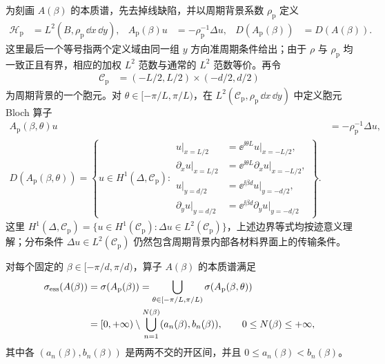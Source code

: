 为刻画 $A(\beta)$ 的本质谱，先去掉线缺陷，并以周期背景系数
$\rho_{\mathrm p}$ 定义
\begin{align}
  \mathcal H_{\mathrm p}
  &=L^2(B,\rho_{\mathrm p}\,\dd x\,\dd y),
  &
  A_{\mathrm p}(\beta)u
  &=-\rho_{\mathrm p}^{-1}\Delta u,
  &
  D(A_{\mathrm p}(\beta))&=D(A(\beta)).
  \label{eq:periodic-background-operator}
\end{align}
这里最后一个等号指两个定义域由同一组 $y$ 方向准周期条件给出；由于
$\rho$ 与 $\rho_{\mathrm p}$ 均一致正且有界，相应的加权 $L^2$ 范数与通常的
$L^2$ 范数等价。再令
\begin{align}
  \mathcal C_{\mathrm p}&=(-L/2,L/2)\times(-d/2,d/2)
  \label{eq:periodic-cell}
\end{align}
为周期背景的一个胞元。对
$\theta\in[-\pi/L,\pi/L)$，在
$L^2(\mathcal C_{\mathrm p},\rho_{\mathrm p}\,\dd x\,\dd y)$ 中定义胞元 Bloch 算子
\begin{equation}
  \begin{aligned}
    A_{\mathrm p}(\beta,\theta)u
    &=-\rho_{\mathrm p}^{-1}\Delta u,\\
    D(A_{\mathrm p}(\beta,\theta))
    =\left\{u\in H^1(\Delta,\mathcal C_{\mathrm p}):{}
    \begin{aligned}
      u|_{x=L/2}
      &=\ee^{\ii\theta L}u|_{x=-L/2},\\
      \partial_xu|_{x=L/2}
      &=\ee^{\ii\theta L}\partial_xu|_{x=-L/2},\\
      u|_{y=d/2}
      &=\ee^{\ii\beta d}u|_{y=-d/2},\\
      \partial_yu|_{y=d/2}
      &=\ee^{\ii\beta d}\partial_yu|_{y=-d/2}
    \end{aligned}\right\}.
  \end{aligned}
  \label{eq:background-bloch-fiber}
\end{equation}
这里
$H^1(\Delta,\mathcal C_{\mathrm p})
=\{u\in H^1(\mathcal C_{\mathrm p}):
\Delta u\in L^2(\mathcal C_{\mathrm p})\}$，上述边界等式均按迹意义理解；分布条件
$\Delta u\in L^2(\mathcal C_{\mathrm p})$ 仍然包含周期背景内部各材料界面上的传输条件。

\begin{conjecture}[分片常数线缺陷算子的本质谱]
  \label{conj:essential-spectrum}
  对每个固定的 $\beta\in[-\pi/d,\pi/d)$，算子 $A(\beta)$ 的本质谱满足
  \begin{align}
    \sigma_{\mathrm{ess}}(A(\beta))
    &=\sigma(A_{\mathrm p}(\beta))
      =\bigcup_{\theta\in[-\pi/L,\pi/L)}
        \sigma(A_{\mathrm p}(\beta,\theta))
      \notag\\
    &=[0,+\infty)\setminus
      \bigcup_{n=1}^{N(\beta)}(a_n(\beta),b_n(\beta)),
    \qquad
    0\leq N(\beta)\leq+\infty,
    \label{eq:conjectured-essential-spectrum}
  \end{align}
  其中各 $(a_n(\beta),b_n(\beta))$ 是两两不交的开区间，并且
  $0\leq a_n(\beta)<b_n(\beta)$。
\end{conjecture}

